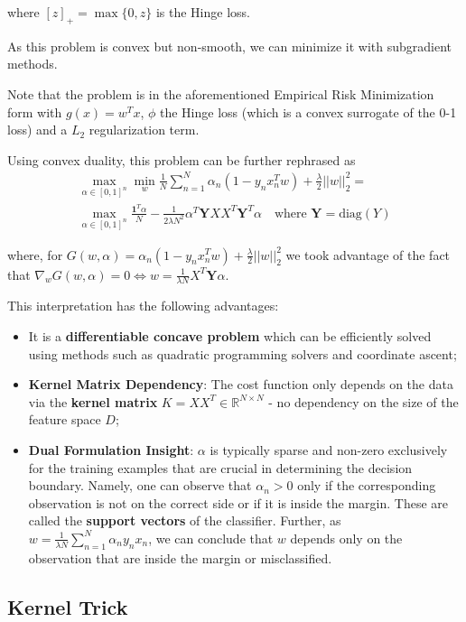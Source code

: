 \documentclass{article}
\newcommand{\R}{\mathbb{R}}
\begin{document}
where $[z]_+ = \max\{0, z\}$ is the Hinge loss.

As this problem is convex but non-smooth, we can minimize it with subgradient methods.

Note that the problem is in the aforementioned Empirical Risk Minimization form with $g(x) = w^T x$, $\phi$ the Hinge loss (which is a convex surrogate of the 0-1 loss) and a $L_2$ regularization term.

Using convex duality, this problem can be further rephrased as
\begin{gather*}
\max_{\alpha \in [0,1]^n} \min_w \frac{1}{N} \sum_{n=1}^N 
    \alpha_n (1 - y_n x_n^T w) + \frac{\lambda}{2} ||w||_2^2 = \\
\max_{\alpha \in [0,1]^n} 
\frac{\mathbf{1}^T \alpha}{N} - \frac{1}{2\lambda N^2} \alpha^T \mathbf{Y}XX^T\mathbf{Y}^T \alpha \quad \text{where } \mathbf{Y} = \text{diag}(Y)
\end{gather*}

where, for $G(w, \alpha) = \alpha_n (1 - y_n x_n^T w) + \frac{\lambda}{2} ||w||_2^2$ we took advantage of the fact that $\nabla_w G(w, \alpha) = 0 \Leftrightarrow w = \frac{1}{\lambda N} X^T \mathbf{Y} \alpha$. 

This interpretation has the following advantages:
\begin{itemize}
    \item It is a \textbf{differentiable concave problem} which can be efficiently solved using methods such as quadratic programming solvers and coordinate ascent;
    \item \textbf{Kernel Matrix Dependency}: The cost function only depends on the data via the \textbf{kernel matrix} $K = XX^T \in \R^{N \times N}$ - no dependency on the size of the feature space $D$;
    \item \textbf{Dual Formulation Insight}: $\alpha$ is typically sparse and non-zero exclusively for the training examples that are crucial in determining the decision boundary.
    Namely, one can observe that $\alpha_n > 0$ only if the corresponding observation is not on the correct side or if it is inside the margin.
    These are called the \textbf{support vectors} of the classifier.
    Further, as $w = \frac{1}{\lambda N} \sum_{n=1}^N \alpha_n y_n x_n$, we can conclude that $w$ depends only on the observation that are inside the margin or misclassified.
\end{itemize}

\subsection{Kernel Trick}
\end{document}
